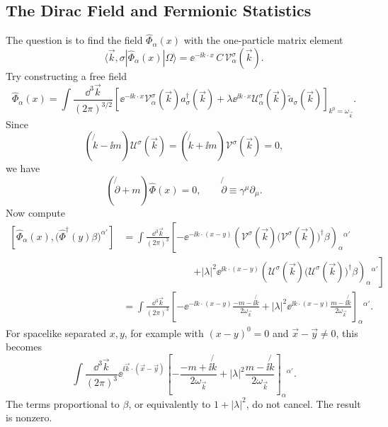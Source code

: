 \subsection{The Dirac Field and Fermionic Statistics}

The question is to find the field \(\widehat\Phi_\alpha(x)\) with the
one-particle matrix element
\[
  \langle \vec k,\sigma|\widehat\Phi_\alpha(x)|\Omega\rangle
  =
  \ee^{-\ii k\cdot x}\,C\,\mathcal V_\alpha^\sigma(\vec k).
\]
Try constructing a free field
\[
  \widehat\Phi_\alpha(x)
  =
  \int\frac{\dd^3\vec k}{(2\pi)^{3/2}}
  \left[
    \ee^{-\ii k\cdot x}
    \mathcal V_\alpha^\sigma(\vec k)a_\sigma^\dagger(\vec k)
    +
    \lambda \ee^{\ii k\cdot x}
    \mathcal U_\alpha^\sigma(\vec k)\widetilde a_\sigma(\vec k)
  \right]_{k^0=\omega_{\vec k}}.
\]
Since
\[
  (\not{k}-\ii m)\mathcal U^\sigma(\vec k)
  =
  (\not{k}+\ii m)\mathcal V^\sigma(\vec k)
  =
  0,
\]
we have
\[
  (\not{\partial}+m)\widehat\Phi(x)=0,
  \qquad
  \not{\partial}\equiv\gamma^\mu\partial_\mu.
\]
Now compute
\[
\begin{aligned}
  \left[
    \widehat\Phi_\alpha(x),
    \bigl(\widehat\Phi^\dagger(y)\beta\bigr)^{\alpha'}
  \right]
  &=
  \int\frac{\dd^3\vec k}{(2\pi)^3}
  \left[
    -\ee^{-\ii k\cdot(x-y)}
    \left(
      \mathcal V^\sigma(\vec k)
      \bigl(\mathcal V^\sigma(\vec k)\bigr)^\dagger\beta
    \right)_\alpha{}^{\alpha'}
  \right.
  \\
  &\hspace{3cm}\left.
    +|\lambda|^2\ee^{\ii k\cdot(x-y)}
    \left(
      \mathcal U^\sigma(\vec k)
      \bigl(\mathcal U^\sigma(\vec k)\bigr)^\dagger\beta
    \right)_\alpha{}^{\alpha'}
  \right]
  \\
  &=
  \int\frac{\dd^3\vec k}{(2\pi)^3}
  \left[
    -\ee^{-\ii k\cdot(x-y)}
    \frac{-m-\ii\not{k}}{2\omega_{\vec k}}
    +
    |\lambda|^2\ee^{\ii k\cdot(x-y)}
    \frac{m-\ii\not{k}}{2\omega_{\vec k}}
  \right]_\alpha{}^{\alpha'}.
\end{aligned}
\]
For spacelike separated \(x,y\), for example with
\((x-y)^0=0\) and \(\vec x-\vec y\neq0\), this becomes
\[
  \int\frac{\dd^3\vec k}{(2\pi)^3}
  \ee^{\ii\vec k\cdot(\vec x-\vec y)}
  \left[
    -\frac{-m+\ii\not{k}}{2\omega_{\vec k}}
    +
    |\lambda|^2
    \frac{m-\ii\not{k}}{2\omega_{\vec k}}
  \right]_\alpha{}^{\alpha'}.
\]
The terms proportional to \(\beta\), or equivalently to
\(1+|\lambda|^2\), do not cancel.  The result is nonzero.

